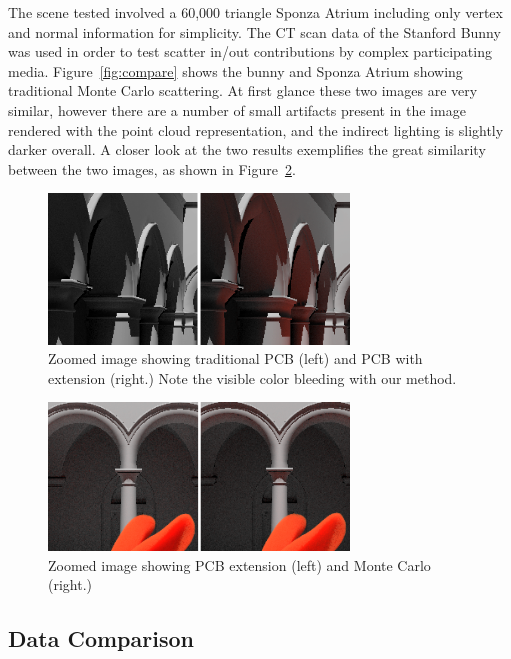 \documentclass[runningheads]{llncs}
\begin{document}
The scene tested involved a 60,000 triangle Sponza Atrium including only vertex and normal information for simplicity.  The CT scan data of the Stanford Bunny was used in order to test scatter in/out contributions by complex participating media.
Figure~\ref{fig:compare} shows the bunny and Sponza Atrium showing traditional Monte Carlo scattering.  At first glance these two images are very similar, however there are a number of small artifacts present in the image rendered with the point cloud representation, and the indirect lighting is slightly darker overall.  A closer look at the two results exemplifies the great similarity between the two images, as shown in Figure~\ref{fig:compare_close}.

\begin{figure}[h!]
    \centering
    \includegraphics[width=80mm]{img/compare_trad_corrected.png}
    \caption{Zoomed image showing traditional PCB (left) and PCB with extension (right.)  Note the visible color bleeding with our method.}
    \label{fig:compare_trad}
\end{figure}

\begin{figure}[h!]
    \centering
    \includegraphics[width=80mm]{img/compare1_corrected.png}
    \caption{Zoomed image showing PCB extension (left) and Monte Carlo (right.)}
    \label{fig:compare_close}
\end{figure}

\subsection{Data Comparison}
\end{document}

